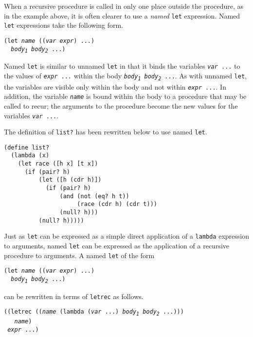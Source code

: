 When a recursive procedure is called in only one place outside
the procedure, as in the example above, it is often clearer to use
a \label{further_s41}\textit{named} \texttt{let} expression.
Named \texttt{let} expressions take the following form.


\begin{alltt}
(let \textit{name} ((\textit{var} \textit{expr}) ...)
  \textit{body\textsubscript{1}} \textit{body\textsubscript{2}} ...)
\end{alltt}


Named \texttt{let} is similar to unnamed \texttt{let} in that it binds
the variables \texttt{\textit{var} ...} to the values of
\texttt{\textit{expr} ...} within
the body \texttt{\textit{body\textsubscript{1}} \textit{body\textsubscript{2}} ...}.
As with unnamed \texttt{let}, the variables are visible only within the
body and not within \texttt{\textit{expr} ...}.
In addition, the variable \texttt{\textit{name}} is bound within the body to
a procedure that may be called to recur; the arguments to
the procedure become the new values for the variables
\texttt{\textit{var} ...}.


The definition of \label{further_s42}\texttt{list?} has been rewritten below to use named
\texttt{let}.


\begin{alltt}
(define list?
  (lambda (x)
    (let race ([h x] [t x])
      (if (pair? h)
          (let ([h (cdr h)])
            (if (pair? h)
                (and (not (eq? h t))
                     (race (cdr h) (cdr t)))
                (null? h)))
          (null? h)))))
\end{alltt}


Just as \texttt{let} can be expressed as a simple direct application
of a \texttt{lambda} expression to arguments, named \texttt{let} can be expressed
as the application of a recursive procedure to arguments.
A named \texttt{let} of the form


\begin{alltt}
(let \textit{name} ((\textit{var} \textit{expr}) ...)
  \textit{body\textsubscript{1}} \textit{body\textsubscript{2}} ...)
\end{alltt}


can be rewritten in terms of \texttt{letrec} as follows.


\begin{alltt}
((letrec ((\textit{name} (lambda (\textit{var} ...) \textit{body\textsubscript{1}} \textit{body\textsubscript{2}} ...)))
   \textit{name})
 \textit{expr} ...)
\end{alltt}


